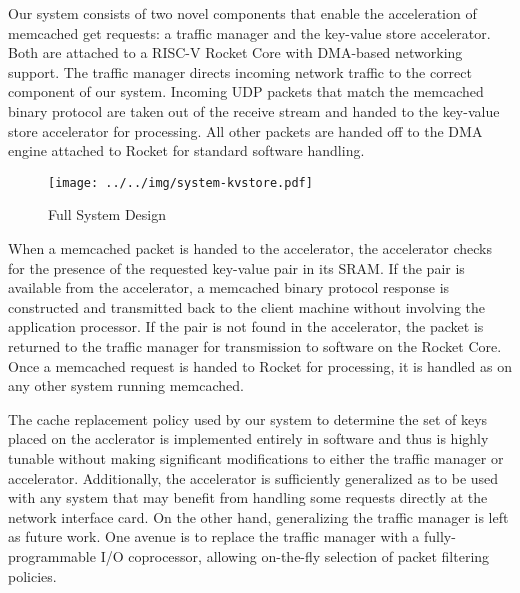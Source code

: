 Our system consists of two novel components that enable the acceleration of 
memcached get requests: a traffic manager and the key-value store accelerator.
Both are attached to a RISC-V Rocket Core with DMA-based networking support. The 
traffic manager directs incoming network traffic to the correct component of 
our system. Incoming UDP packets that match the memcached binary protocol 
are taken out of the receive stream and handed to the key-value store 
accelerator for processing. All other packets are handed off to the DMA 
engine attached to Rocket for standard software handling.

\begin{figure}[t]
\begin{center}
\label{fig:full-sys}
\texttt{[image: ../../img/system-kvstore.pdf]}
\caption{Full System Design}
\end{center}
\end{figure}

When a memcached packet is handed to the accelerator, the accelerator checks 
for the presence of the requested key-value pair in its SRAM. If the pair is
available from the accelerator, a memcached binary protocol response is 
constructed and transmitted back to the client machine without involving the 
application processor. If the pair is not found in the accelerator, the packet 
is returned to the traffic manager for transmission to software on the Rocket 
Core. Once a memcached request is handed to Rocket for processing, it is 
handled as on any other system running memcached.

The cache replacement policy used by our system to determine the set of keys
placed on the acclerator is implemented entirely in software and thus is 
highly tunable without making significant modifications to either the traffic
manager or accelerator. Additionally, the accelerator is sufficiently 
generalized as to be used with any system that may benefit from handling some
requests directly at the network interface card. On the other hand, 
generalizing the traffic manager is left as future work. One avenue is to 
replace the traffic manager with a fully-programmable I/O coprocessor, allowing
on-the-fly selection of packet filtering policies.



